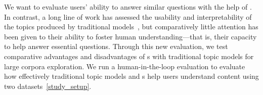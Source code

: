 We want to evaluate users' ability to answer similar questions with the help of .
%
In contrast, a long line of work has assessed the usability and
interpretability of the topics produced by traditional models~\cite{Newman2010AutomaticEO, doogan-buntine-2021-topic},
but comparatively little attention has been given to their ability to
foster human understanding---that is, their capacity to help answer
essential questions.
%
Through this new evaluation, we test comparative advantages and disadvantages of \mm{}s with traditional topic models for large corpora exploration.
%
We run a human-in-the-loop evaluation to evaluate how effectively traditional topic models and \mm{}s help users understand content using two datasets~\ref{study_setup}.







